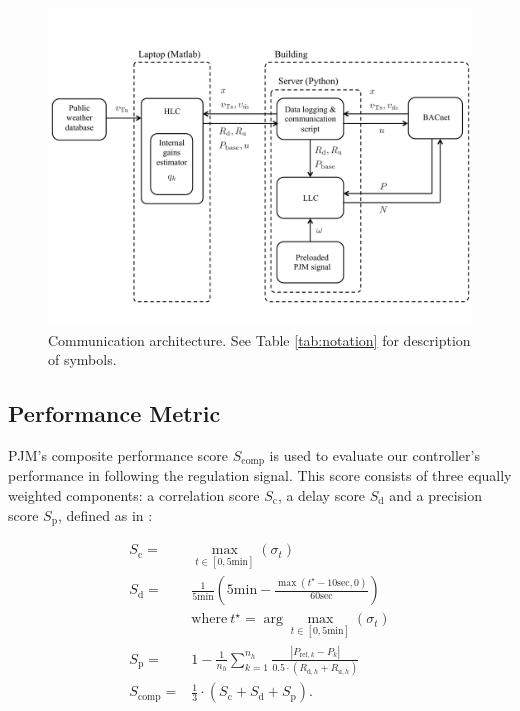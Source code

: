 \begin{figure}[t]
\centering
\includegraphics[width = \textwidth]{chapters/building_exp/figures/comm_architecture.pdf}
\caption{Communication architecture. See Table \ref{tab:notation} for description of symbols.}
\label{fig:comm_architecture}
\vspace*{-0.45cm}
\end{figure}




\subsection{Performance Metric}\label{sec:performance_metric}

PJM's composite performance score $S_\text{comp}$ is used to evaluate our controller's performance in following the regulation signal. 
This score consists of three equally weighted components: a correlation score $S_\text{c}$, a delay score $S_\text{d}$ and a precision score $S_\text{p}$, defined as in \cite{PJM12}:

\begin{equation}\label{eq:pjm_score}
\begin{aligned}
S_\text{c} = & \max_{t \in [0, 5 \text{min}]} (\sigma_t) \\
S_\text{d} = & \frac{1}{5 \text{min}} \left(5 \text{min} - \frac{\max(t^\star - 10 \text{sec},0)}{60\text{sec}}\right) \\
& \text{where}~t^\star =  \arg\max_{t \in [0, 5 \text{min}]} (\sigma_t)\\
S_\text{p} = & 1 - \frac{1}{n_h} \sum_{k=1}^{n_h}  \frac{\left | P_{\text{ref},k} - P_{k}\right |}{0.5\cdot(R_{\text{d},h} + R_{\text{u},h})}  \\
S_\text{comp} = & \frac{1}{3} \cdot \left( S_\text{c} + S_\text{d} + S_\text{p} \right).\\
\end{aligned}
\end{equation}

